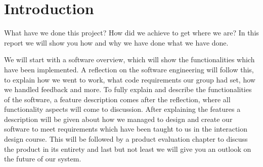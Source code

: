\chapter{Introduction} %

What have we done this project? How did we achieve to get where we are? In this report we will show you how and why we have done what we have done.

We will start with a software overview, which will show the functionalities which have been implemented. A reflection on the software engineering will follow this, to explain how we went to work, what code requirements our group had set, how we handled feedback and more. To fully explain and describe the functionalities of the software, a feature description comes after the reflection, where all functionality aspects will come to discussion. After explaining the features a description will be given about how we managed to design and create our software to meet requirements which have been taught to us in the interaction design course. This will be followed by a product evaluation chapter to discuss the product in its entirety and last but not least we will give you an outlook on the future of our system. 